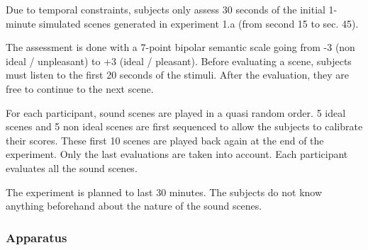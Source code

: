 \documentclass[12pt]{elsarticle}
\begin{document}

Due to temporal constraints, subjects only assess 30 seconds of the initial 1-minute simulated scenes generated in experiment 1.a (from second 15 to sec. 45).


The assessment is done with a 7-point bipolar semantic scale going from -3 (non ideal / unpleasant) to +3 (ideal / pleasant). Before evaluating a scene, subjects must listen to the first 20 seconds of the stimuli. After the evaluation, they are free to continue to the next scene.


For each participant, sound scenes are played in a quasi random order. 5 ideal scenes and 5 non ideal scenes are first sequenced to allow the subjects to calibrate their scores. These first 10 scenes are played back again at the end of the experiment. Only the last evaluations are taken into account. Each participant evaluates all the sound scenes.


The experiment is planned to last 30 minutes. The subjects do not know anything beforehand about the nature of the sound scenes.

\subsubsection*{Apparatus}

\end{document}

